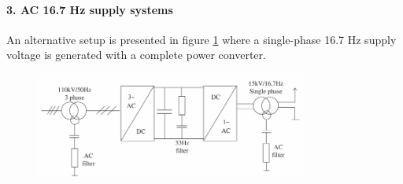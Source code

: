 \paragraph{3. AC 16.7 Hz supply systems\\}
An alternative setup is presented in figure \ref{fig:abad2016e} where a single-phase 16.7 Hz supply voltage is generated with a complete power converter. 

\begin{figure}[h!]
	\centering
	\begin{minipage}{.6\textwidth}
		\centering
		\includegraphics[width=0.8\textwidth,keepaspectratio]{figures/31.PowerS/abad2016e}
		\label{fig:abad2016e}
	\end{minipage}
\end{figure}

